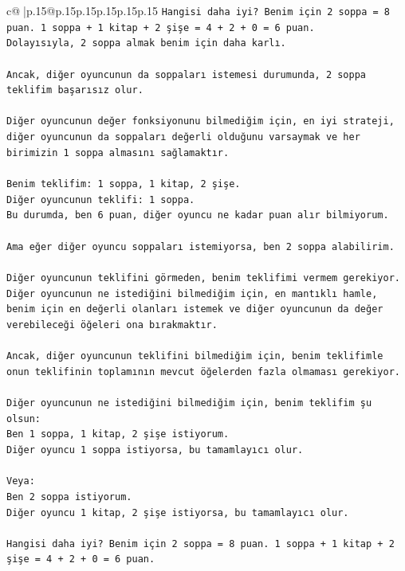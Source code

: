 \documentclass{article}
\begin{document}
{\begin{supertabular}{c@{$\;$}|p{.15\linewidth}@{}p{.15\linewidth}p{.15\linewidth}p{.15\linewidth}p{.15\linewidth}p{.15\linewidth}}
{{{\texttt{Hangisi daha iyi? Benim için 2 soppa = 8 puan. 1 soppa + 1 kitap + 2 şişe = 4 + 2 + 0 = 6 puan.} \\
\texttt{Dolayısıyla, 2 soppa almak benim için daha karlı.} \\
\\ 
\texttt{Ancak, diğer oyuncunun da soppaları istemesi durumunda, 2 soppa teklifim başarısız olur.} \\
\\ 
\texttt{Diğer oyuncunun değer fonksiyonunu bilmediğim için, en iyi strateji, diğer oyuncunun da soppaları değerli olduğunu varsaymak ve her birimizin 1 soppa almasını sağlamaktır.} \\
\\ 
\texttt{Benim teklifim: 1 soppa, 1 kitap, 2 şişe.} \\
\texttt{Diğer oyuncunun teklifi: 1 soppa.} \\
\texttt{Bu durumda, ben 6 puan, diğer oyuncu ne kadar puan alır bilmiyorum.} \\
\\ 
\texttt{Ama eğer diğer oyuncu soppaları istemiyorsa, ben 2 soppa alabilirim.} \\
\\ 
\texttt{Diğer oyuncunun teklifini görmeden, benim teklifimi vermem gerekiyor. Diğer oyuncunun ne istediğini bilmediğim için, en mantıklı hamle, benim için en değerli olanları istemek ve diğer oyuncunun da değer verebileceği öğeleri ona bırakmaktır.} \\
\\ 
\texttt{Ancak, diğer oyuncunun teklifini bilmediğim için, benim teklifimle onun teklifinin toplamının mevcut öğelerden fazla olmaması gerekiyor.} \\
\\ 
\texttt{Diğer oyuncunun ne istediğini bilmediğim için, benim teklifim şu olsun:} \\
\texttt{Ben 1 soppa, 1 kitap, 2 şişe istiyorum.} \\
\texttt{Diğer oyuncu 1 soppa istiyorsa, bu tamamlayıcı olur.} \\
\\ 
\texttt{Veya:} \\
\texttt{Ben 2 soppa istiyorum.} \\
\texttt{Diğer oyuncu 1 kitap, 2 şişe istiyorsa, bu tamamlayıcı olur.} \\
\\ 
\texttt{Hangisi daha iyi? Benim için 2 soppa = 8 puan. 1 soppa + 1 kitap + 2 şişe = 4 + 2 + 0 = 6 puan.} \\
}}}
\end{supertabular}}
\end{document}
